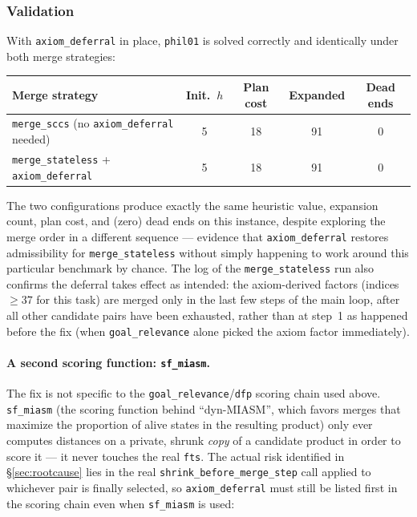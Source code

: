 \documentclass[11pt,a4paper]{article}
\begin{document}
\subsubsection{Validation}

With \texttt{axiom\_deferral} in place, \texttt{phil01} is solved correctly
and identically under both merge strategies:

\begin{center}
\begin{tabular}{lcccc}
\toprule
\textbf{Merge strategy} & \textbf{Init.\ $h$} & \textbf{Plan cost} & \textbf{Expanded} & \textbf{Dead ends} \\
\midrule
\texttt{merge\_sccs} (no \texttt{axiom\_deferral} needed) & 5 & 18 & 91 & 0 \\
\texttt{merge\_stateless} + \texttt{axiom\_deferral} & 5 & 18 & 91 & 0 \\
\bottomrule
\end{tabular}
\end{center}

The two configurations produce exactly the same heuristic value, expansion
count, plan cost, and (zero) dead ends on this instance, despite exploring
the merge order in a different sequence --- evidence that \texttt{axiom\_deferral}
restores admissibility for \texttt{merge\_stateless} without simply
happening to work around this particular benchmark by chance. The log of
the \texttt{merge\_stateless} run also confirms the deferral takes effect
as intended: the axiom-derived factors (indices $\geq 37$ for this task) are
merged only in the last few steps of the main loop, after all other
candidate pairs have been exhausted, rather than at step~1 as happened
before the fix (when \texttt{goal\_relevance} alone picked the axiom factor
immediately).

\paragraph{A second scoring function: \texttt{sf\_miasm}.} The fix is not
specific to the \texttt{goal\_relevance}/\texttt{dfp} scoring chain used
above. \texttt{sf\_miasm} (the scoring function behind ``dyn-MIASM'', which
favors merges that maximize the proportion of alive states in the resulting
product) only ever computes distances on a private, shrunk \emph{copy} of a
candidate product in order to score it --- it never touches the real
\texttt{fts}. The actual risk identified in \S\ref{sec:rootcause} lies in the
real \texttt{shrink\_before\_merge\_step} call applied to whichever pair is
finally selected, so \texttt{axiom\_deferral} must still be listed first in
the scoring chain even when \texttt{sf\_miasm} is used:
\end{document}
